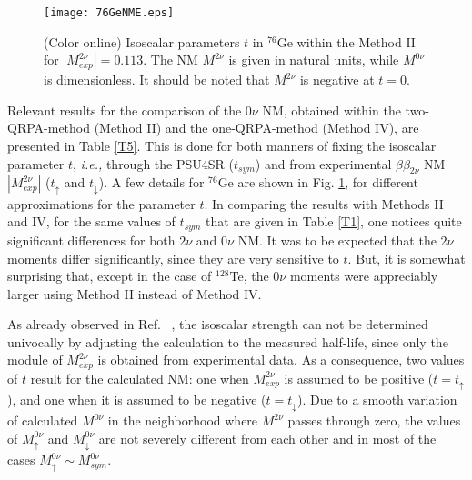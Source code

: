 \documentclass[nofootinbib,twocolumn,eqsecnum,floats,aps]{revtex4}
\def\ie{{\it i.e., }}
\def\b {{\beta}}
\begin{document}
{\begin{table}[t]
\begin{center}
\begin{tabular}{|c|c|crc|ccc|}
\end{tabular}
\end{center}
\end{table}
\begin{figure}[h]
\centering
\texttt{[image: 76GeNME.eps]}
\caption{\label{F2}(Color online)
 Isoscalar parameters $t$ in $^{76}$Ge within the Method II
for  $|M^{2\nu}_{exp}|=0.113$.
The NM $M^{2\nu}$ is given in natural units, while $M^{0\nu}$ is dimensionless.  It should be noted that $M^{2\nu}$ is negative at $t=0$. }
\end{figure}
Relevant results for the comparison of the $0\nu$ NM, obtained within  the
two-QRPA-method (Method II) and the one-QRPA-method (Method IV), are presented
in Table \ref{T5}. This is done for both manners of fixing the isoscalar
parameter $t$, \ie through the PSU4SR %
($t_{sym}$) and    from  experimental  $\b\b_{2\nu}$ NM
$|M^{2\nu}_{exp}|$ ($t_\uparrow$ and $t_\downarrow$).
A few details for $^{76}$Ge are shown in Fig. \ref{F2},
for different approximations for the parameter $t$.
In comparing  the   results with  Methods II and  IV, for the same values of  $t_{sym}$ that are given in Table \ref{T1},
one notices quite significant differences for both $2\nu$ and $0\nu$ NM. It was to be expected that  the $2\nu$ moments differ significantly, since they
are very sensitive to $t$. But, it is somewhat surprising that, except in the case of $^{128}$Te, the $0\nu$ moments were appreciably larger using Method II instead of Method IV.

As already observed in Ref. ~\cite{Krm94}, the isoscalar strength  can not be determined univocally by adjusting the calculation to the measured half-life, since only the   module of $M^{2\nu}_{exp}$ is obtained from experimental data.
As a consequence, two values of $t$ result for the calculated NM:  one when $M^{2\nu}_{exp}$ is assumed to be positive ($t=t_\uparrow$), %
and one when it is assumed to be  negative ($t=t_\downarrow$).
Due to a smooth variation of calculated $M^{0\nu}$ in the neighborhood where $M^{2\nu}$ passes through zero, the values of $M^{0\nu}_\uparrow$ and $M^{0\nu}_\downarrow$ are not severely different from each other   and in most of the cases $M^{0\nu}_\uparrow\sim M^{0\nu}_{sym}$.

}
\end{document}
